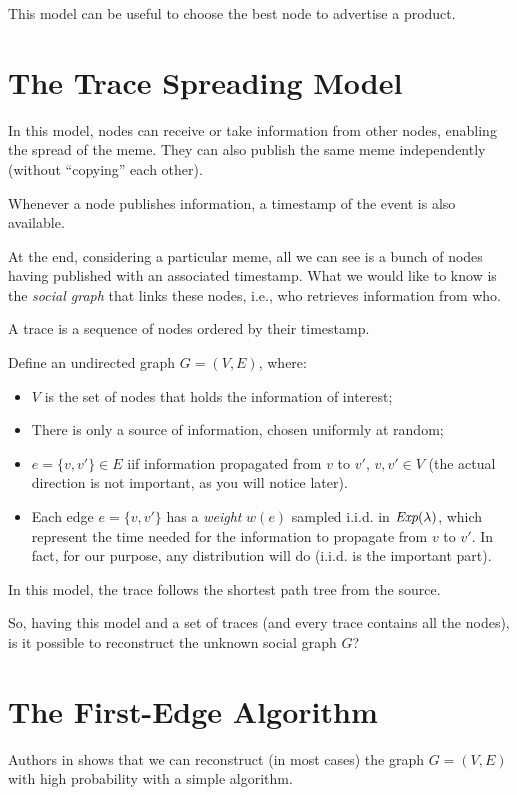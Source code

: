 This model can be useful to choose the best node to advertise a product.

\section{The Trace Spreading Model}

In this model, nodes can receive or take information from other nodes, enabling the spread of the meme. They can also publish the same meme independently (without ``copying'' each other).

Whenever a node publishes information, a timestamp of the event is also available.

At the end, considering a particular meme, all we can see is a bunch of nodes having published with an associated timestamp. What we would like to know is the \emph{social graph} that links these nodes, i.e., who retrieves information from who.

\begin{defn}[Trace]
    A trace is a sequence of nodes ordered by their timestamp.
\end{defn}

Define an undirected graph $G = (V, E)$, where:
\begin{itemize}
 \item $V$ is the set of nodes that holds the information of interest;
 \item There is only a source of information, chosen uniformly at random;
 \item $e = \{v, v'\} \in E$ iif information propagated from $v$ to $v'$, $v, v' \in V$ (the actual direction is not important, as you will notice later). 
 \item Each edge $e = \{v, v'\}$ has a \emph{weight} $w(e)$ sampled i.i.d. in $\emph{Exp}(\lambda)$, which represent the time needed for the information to propagate from $v$ to $v'$. In fact, for our purpose, any distribution will do (i.i.d. is the important part).
\end{itemize}

In this model, the trace follows the shortest path tree from the source.

So, having this model and a set of traces (and every trace contains all the nodes), is it possible to reconstruct the unknown social graph $G$? 

\section{The First-Edge Algorithm}
Authors in \cite{KDD13} shows that we can reconstruct (in most cases) the graph $G=(V, E)$ with high probability with a simple algorithm.
 
